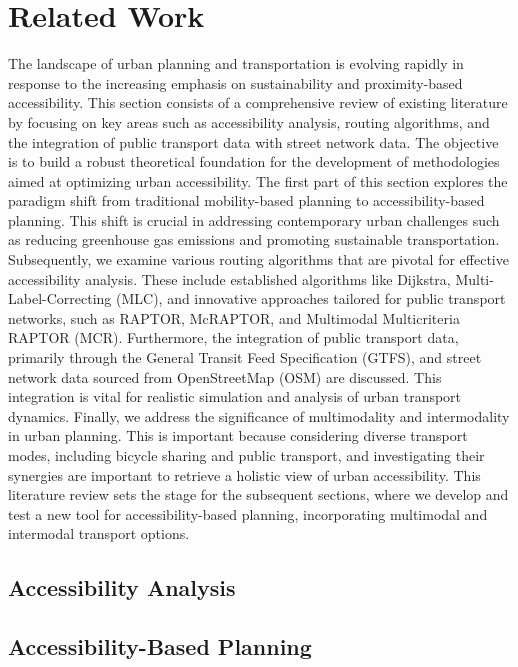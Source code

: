 \clearpage
\section{Related Work}
\label{sec:related_work}

The landscape of urban planning and transportation is evolving rapidly in response to the increasing emphasis on sustainability and proximity-based accessibility. 
This section consists of a comprehensive review of existing literature by focusing on key areas such as accessibility analysis, routing algorithms, and the integration of public transport data with street network data. 
The objective is to build a robust theoretical foundation for the development of methodologies aimed at optimizing urban accessibility. 
The first part of this section explores the paradigm shift from traditional mobility-based planning to accessibility-based planning.
This shift is crucial in addressing contemporary urban challenges such as reducing greenhouse gas emissions and promoting sustainable transportation. 
Subsequently, we examine various routing algorithms that are pivotal for effective accessibility analysis. 
These include established algorithms like Dijkstra, Multi-Label-Correcting (MLC), and innovative approaches tailored for public transport networks, such as RAPTOR, McRAPTOR, and Multimodal Multicriteria RAPTOR (MCR). 
Furthermore, the integration of public transport data, primarily through the General Transit Feed Specification (GTFS), and street network data sourced from OpenStreetMap (OSM) are discussed. 
This integration is vital for realistic simulation and analysis of urban transport dynamics.
Finally, we address the significance of multimodality and intermodality in urban planning.
This is important because considering diverse transport modes, including bicycle sharing and public transport, and investigating their synergies are important to retrieve a holistic view of urban accessibility.
This literature review sets the stage for the subsequent sections, where we develop and test a new tool for accessibility-based planning, incorporating multimodal and intermodal transport options.

\subsection{Accessibility Analysis}
\label{subsec:accessibility_analysis}

\subsection{Accessibility-Based Planning}
\label{subsec:accessibility_based_planning}

